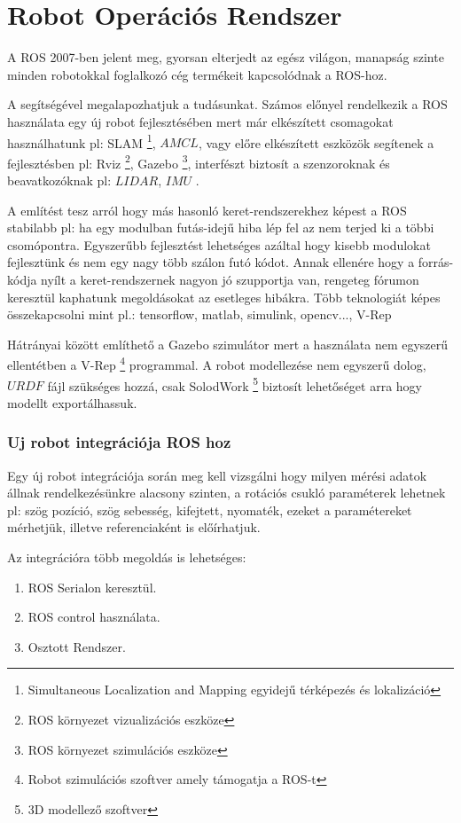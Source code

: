 

\section{Robot Operációs Rendszer} 
A ROS 2007-ben jelent meg, gyorsan elterjedt az egész világon, manapság szinte minden robotokkal foglalkozó cég termékeit kapcsolódnak a ROS-hoz.

A \cite{lentin2015} \cite{NagyPirosKonyv} segítségével megalapozhatjuk a tudásunkat. Számos előnyel rendelkezik a ROS használata egy új robot fejlesztésében mert már elkészített csomagokat használhatunk pl: SLAM \footnote{ Simultaneous Localization and Mapping egyidejű térképezés és lokalizáció}, $AMCL$, vagy előre elkészített eszközök segítenek a fejlesztésben pl: Rviz  \footnote{ROS környezet vizualizációs eszköze}, Gazebo \footnote{ROS környezet szimulációs eszköze}, interfészt biztosít a szenzoroknak és beavatkozóknak pl: $LIDAR$, $IMU$ .

A \cite{lentin2015} említést tesz arról hogy más hasonló keret-rendszerekhez képest a ROS stabilabb pl: ha egy modulban futás-idejű hiba lép fel az nem terjed ki a többi csomópontra.
Egyszerűbb fejlesztést lehetséges azáltal hogy kisebb modulokat fejlesztünk és nem egy nagy több szálon futó kódot. Annak ellenére hogy a forrás-kódja nyílt a keret-rendszernek nagyon jó szupportja van, rengeteg fórumon keresztül kaphatunk megoldásokat az esetleges hibákra. Több teknologiát képes összekapcsolni mint pl.: tensorflow, matlab, simulink, opencv..., V-Rep

Hátrányai között említhető a Gazebo szimulátor mert a használata nem egyszerű ellentétben a V-Rep \footnote{Robot szimulációs szoftver amely támogatja a ROS-t} programmal. A robot modellezése nem egyszerű dolog, $URDF$ fájl szükséges hozzá, csak SolodWork \footnote{3D modellező szoftver} biztosít  lehetőséget arra hogy modellt exportálhassuk.

\subsubsection{Uj robot integrációja ROS hoz}
Egy új robot integrációja során meg kell vizsgálni hogy milyen mérési adatok állnak rendelkezésünkre alacsony szinten, a rotációs csukló  paraméterek lehetnek pl: szög pozíció, szög sebesség, kifejtett, nyomaték, ezeket a paramétereket mérhetjük, illetve referenciaként is előírhatjuk. 

Az integrációra több megoldás is lehetséges:
\begin{enumerate}[label=(\alph*)]
	\item ROS Serialon keresztül.
	\item ROS control használata.
	\item Osztott Rendszer.
\end{enumerate}

